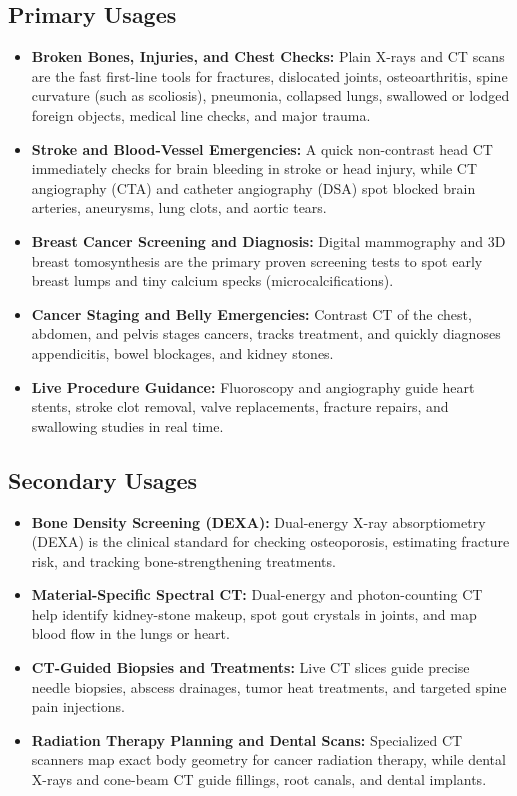 \subsection{Primary Usages}
\begin{itemize}
  \item \textbf{Broken Bones, Injuries, and Chest Checks:} Plain X-rays and CT scans are the fast first-line tools for fractures, dislocated joints, osteoarthritis, spine curvature (such as scoliosis), pneumonia, collapsed lungs, swallowed or lodged foreign objects, medical line checks, and major trauma.
  \item \textbf{Stroke and Blood-Vessel Emergencies:} A quick non-contrast head CT immediately checks for brain bleeding in stroke or head injury, while CT angiography (CTA) and catheter angiography (DSA) spot blocked brain arteries, aneurysms, lung clots, and aortic tears.
  \item \textbf{Breast Cancer Screening and Diagnosis:} Digital mammography and 3D breast tomosynthesis are the primary proven screening tests to spot early breast lumps and tiny calcium specks (microcalcifications).
  \item \textbf{Cancer Staging and Belly Emergencies:} Contrast CT of the chest, abdomen, and pelvis stages cancers, tracks treatment, and quickly diagnoses appendicitis, bowel blockages, and kidney stones.
  \item \textbf{Live Procedure Guidance:} Fluoroscopy and angiography guide heart stents, stroke clot removal, valve replacements, fracture repairs, and swallowing studies in real time.
\end{itemize}

\subsection{Secondary Usages}
\begin{itemize}
  \item \textbf{Bone Density Screening (DEXA):} Dual-energy X-ray absorptiometry (DEXA) is the clinical standard for checking osteoporosis, estimating fracture risk, and tracking bone-strengthening treatments.
  \item \textbf{Material-Specific Spectral CT:} Dual-energy and photon-counting CT help identify kidney-stone makeup, spot gout crystals in joints, and map blood flow in the lungs or heart.
  \item \textbf{CT-Guided Biopsies and Treatments:} Live CT slices guide precise needle biopsies, abscess drainages, tumor heat treatments, and targeted spine pain injections.
  \item \textbf{Radiation Therapy Planning and Dental Scans:} Specialized CT scanners map exact body geometry for cancer radiation therapy, while dental X-rays and cone-beam CT guide fillings, root canals, and dental implants.
\end{itemize}

